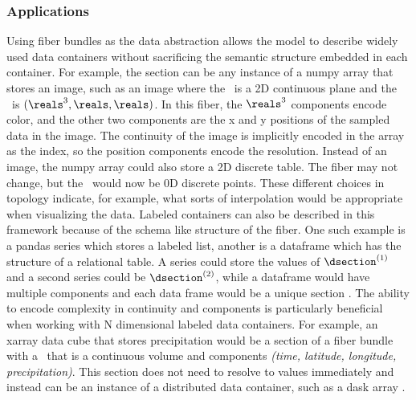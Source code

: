 \documentclass[../main.tex]{subfiles}
\begin{document}
\subsubsection{Applications}
Using fiber bundles as the data abstraction allows the model to describe widely used data containers without sacrificing the semantic structure embedded in each container. For example, the section can be any instance of a numpy array\cite{harris2020array} that stores an image, such as an image where the \dbase\ is a 2D continuous plane and the \dfiber\ is \((\reals^{3}, \reals, \reals)\). In this fiber, the \(\reals^3\) components encode color, and the other two components are the x and y positions of the sampled data in the image. The continuity of the image is implicitly encoded in the array as the index, so the position components encode the resolution. Instead of an image, the numpy array could also store a 2D discrete table. The fiber may not change, but the \dbase\ would now be 0D discrete points. These different choices in topology indicate, for example, what sorts of interpolation would be appropriate when visualizing the data. 
Labeled containers can also be described in this framework because of the schema like structure of the fiber. One such example is a pandas series which stores a labeled list, another is a  dataframe\cite{jeff_reback_2020_3715232} which has the structure of a relational table. A series could store the values of \(\dsection^{(1)}\) and a second series could be  \(\dsection^{(2)}\), while a dataframe would have multiple components and each data frame would be a unique section \dsection. The ability to encode complexity in continuity and components is particularly beneficial when working with  N dimensional labeled data containers. For example, an xarray\cite{hoyer2017xarray} data cube that stores precipitation would be a section of a fiber bundle with a \dbase\ that is a continuous volume and components \textit{(time, latitude, longitude, precipitation)}. This section does not need to resolve to values immediately and instead can be an instance of a distributed data container, such as a dask array \cite{rocklinDaskParallelComputation2015}. 
\end{document}
